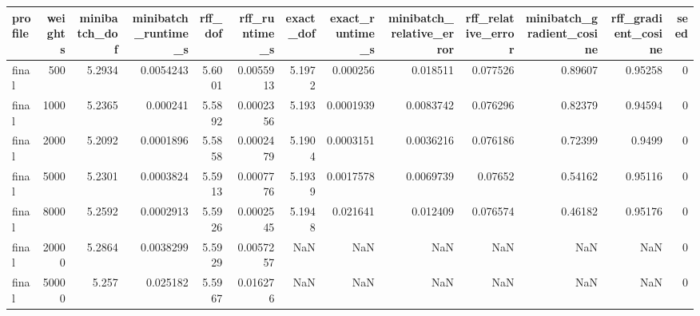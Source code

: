 \begin{tabular}{lrrrrrrrrrrrr}
\toprule
profile & weights & minibatch\_dof & minibatch\_runtime\_s & rff\_dof & rff\_runtime\_s & exact\_dof & exact\_runtime\_s & minibatch\_relative\_error & rff\_relative\_error & minibatch\_gradient\_cosine & rff\_gradient\_cosine & seed \\
\midrule
final & 500 & 5.2934 & 0.0054243 & 5.6001 & 0.0055913 & 5.1972 & 0.000256 & 0.018511 & 0.077526 & 0.89607 & 0.95258 & 0 \\
final & 1000 & 5.2365 & 0.000241 & 5.5892 & 0.0002356 & 5.193 & 0.0001939 & 0.0083742 & 0.076296 & 0.82379 & 0.94594 & 0 \\
final & 2000 & 5.2092 & 0.0001896 & 5.5858 & 0.0002479 & 5.1904 & 0.0003151 & 0.0036216 & 0.076186 & 0.72399 & 0.9499 & 0 \\
final & 5000 & 5.2301 & 0.0003824 & 5.5913 & 0.0007776 & 5.1939 & 0.0017578 & 0.0069739 & 0.07652 & 0.54162 & 0.95116 & 0 \\
final & 8000 & 5.2592 & 0.0002913 & 5.5926 & 0.0002545 & 5.1948 & 0.021641 & 0.012409 & 0.076574 & 0.46182 & 0.95176 & 0 \\
final & 20000 & 5.2864 & 0.0038299 & 5.5929 & 0.0057257 & NaN & NaN & NaN & NaN & NaN & NaN & 0 \\
final & 50000 & 5.257 & 0.025182 & 5.5967 & 0.016276 & NaN & NaN & NaN & NaN & NaN & NaN & 0 \\
\bottomrule
\end{tabular}
